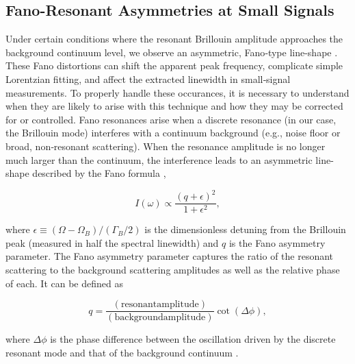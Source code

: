 \subsection{Fano-Resonant Asymmetries at Small Signals}
\label{Results:Fano-Resonant Asymmetries at Small Signals}

Under certain conditions where the resonant Brillouin amplitude approaches the background continuum level, we observe an asymmetric, Fano‐type line-shape \cite{fano1961effects, limonov2017fano, limonov2021fano, kroner2008nonlinear}. These Fano distortions can shift the apparent peak frequency, complicate simple Lorentzian fitting, and affect the extracted linewidth in small‐signal measurements. \cite{miroshnichenko2010fano} To properly handle these occurances, it is necessary to understand when they are likely to arise with this technique and how they may be corrected for or controlled. Fano resonances arise when a discrete resonance (in our case, the Brillouin mode) interferes with a continuum background (e.g., noise floor or broad, non‐resonant scattering). When the resonance amplitude is no longer much larger than the continuum, the interference leads to an asymmetric line-shape described by the Fano formula \cite{fano1961effects},

\begin{equation}
I(\omega) \propto \frac{(q + \epsilon)^2}{1 + \epsilon^2},
\label{eq:fano}
\end{equation}

where \(\epsilon \equiv (\Omega - \Omega_{B})/(\Gamma_{B}/2)\) is the dimensionless detuning from the Brillouin peak (measured in half the spectral linewidth) and \(q\) is the Fano asymmetry parameter. The Fano asymmetry parameter captures the ratio of the resonant scattering to the background scattering amplitudes as well as the relative phase of each. It can be defined as

\begin{equation}
  q = \frac{(\mathrm{resonant amplitude})}{(\mathrm{background amplitude})}\cot{(\Delta\phi)},
\end{equation}

where \(\Delta\phi\) is the phase difference between the oscillation driven by the discrete resonant mode and that of the background continuum \cite{limonov2017fano, ko2023full, gu2020fano}.

